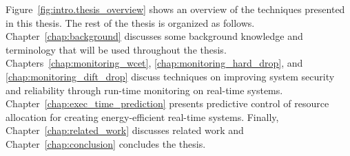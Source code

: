 Figure~\ref{fig:intro.thesis_overview} shows an overview of the techniques
presented in this thesis.
The rest of the thesis is organized as follows.
Chapter~\ref{chap:background} discusses some background knowledge and
terminology that will be used throughout the thesis.
Chapters~\ref{chap:monitoring_wcet}, \ref{chap:monitoring_hard_drop}, and
\ref{chap:monitoring_dift_drop} discuss techniques on improving system security
and reliability through run-time monitoring on real-time systems. 
Chapter~\ref{chap:exec_time_prediction} presents predictive control of resource
allocation for creating energy-efficient real-time systems.
Finally, Chapter~\ref{chap:related_work}
discusses related work and Chapter~\ref{chap:conclusion} concludes the thesis.
